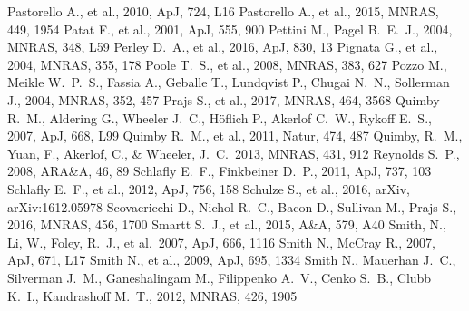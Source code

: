 \documentclass[useAMS,usenatbib]{mn2e}
\begin{document}
\begin{thebibliography}{99}
 Pastorello A., et al., 2010, ApJ, 724, L16 
 Pastorello A., et al., 2015, MNRAS, 449, 1954 
 Patat F., et al., 2001, ApJ, 555, 900 
 Pettini M., Pagel B.~E.~J., 2004, MNRAS, 348, L59 
 Perley D.~A., et al., 2016, ApJ, 830, 13 
 Pignata G., et al., 2004, MNRAS, 355, 178
Poole T.~S., et al., 2008, MNRAS, 383, 627 
 Pozzo M., Meikle W.~P.~S., Fassia A., Geballe T., Lundqvist P., Chugai N.~N., Sollerman J., 2004, MNRAS, 352, 457
 Prajs S., et al., 2017, MNRAS, 464, 3568 
 Quimby R.~M., Aldering G., Wheeler J.~C., H{\"o}flich P., Akerlof C.~W., Rykoff E.~S., 2007, ApJ, 668, L99 
Quimby R.~M., et al., 2011, Natur, 474, 487 
 Quimby, R.~M., Yuan, F., 
Akerlof, C., \& Wheeler, J.~C.\ 2013, MNRAS, 431, 912
 Reynolds S.~P., 2008, ARA\&A, 46, 89
 Schlafly E.~F., Finkbeiner D.~P., 2011, ApJ, 737, 103 
 Schlafly E.~F., et al., 2012, ApJ, 756, 158 
 Schulze S., et al., 2016, arXiv, arXiv:1612.05978 
 Scovacricchi D., Nichol R.~C., Bacon D., Sullivan M., Prajs S., 2016, MNRAS, 456, 1700 
 Smartt S.~J., et al., 2015, A\&A, 579, A40 
 Smith, N., Li, W., Foley, 
R.~J., et al.\ 2007, ApJ, 666, 1116
 Smith N., McCray R., 2007, ApJ, 671, L17 
 Smith N., et al., 2009, ApJ, 695, 1334 
 Smith N., Mauerhan J.~C., Silverman J.~M., Ganeshalingam M., Filippenko A.~V., Cenko S.~B., Clubb K.~I., Kandrashoff M.~T., 2012, MNRAS, 426, 1905 

\end{thebibliography}
\end{document}
